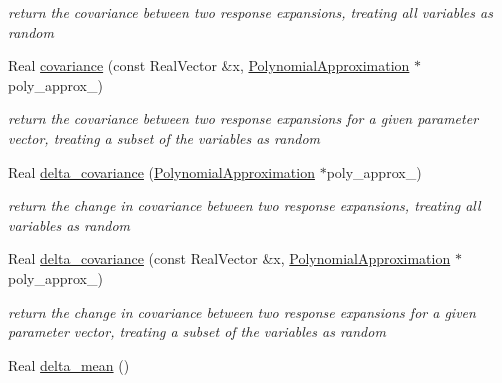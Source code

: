 \begin{DoxyCompactItemize}
\begin{DoxyCompactList}\small\item\em return the covariance between two response expansions, treating all variables as random \end{DoxyCompactList}\item 
Real \hyperlink{classPecos_1_1HierarchInterpPolyApproximation_afc1731a3d89818d49c03a3c20a7a2898}{covariance} (const Real\+Vector \&x, \hyperlink{classPecos_1_1PolynomialApproximation}{Polynomial\+Approximation} $\ast$poly\+\_\+approx\+\_)\label{classPecos_1_1HierarchInterpPolyApproximation_afc1731a3d89818d49c03a3c20a7a2898}

\begin{DoxyCompactList}\small\item\em return the covariance between two response expansions for a given parameter vector, treating a subset of the variables as random \end{DoxyCompactList}\item 
Real \hyperlink{classPecos_1_1HierarchInterpPolyApproximation_ae3f6a8d87917102636d171f5c86a2fb5}{delta\+\_\+covariance} (\hyperlink{classPecos_1_1PolynomialApproximation}{Polynomial\+Approximation} $\ast$poly\+\_\+approx\+\_)\label{classPecos_1_1HierarchInterpPolyApproximation_ae3f6a8d87917102636d171f5c86a2fb5}

\begin{DoxyCompactList}\small\item\em return the change in covariance between two response expansions, treating all variables as random \end{DoxyCompactList}\item 
Real \hyperlink{classPecos_1_1HierarchInterpPolyApproximation_a5a89afe07fb520282fa35dfc9ca2b0a1}{delta\+\_\+covariance} (const Real\+Vector \&x, \hyperlink{classPecos_1_1PolynomialApproximation}{Polynomial\+Approximation} $\ast$poly\+\_\+approx\+\_)\label{classPecos_1_1HierarchInterpPolyApproximation_a5a89afe07fb520282fa35dfc9ca2b0a1}

\begin{DoxyCompactList}\small\item\em return the change in covariance between two response expansions for a given parameter vector, treating a subset of the variables as random \end{DoxyCompactList}\item 
Real \hyperlink{classPecos_1_1HierarchInterpPolyApproximation_aa276ec09d706b03780f9bc01af40514e}{delta\+\_\+mean} ()\label{classPecos_1_1HierarchInterpPolyApproximation_aa276ec09d706b03780f9bc01af40514e}


\end{DoxyCompactItemize}
